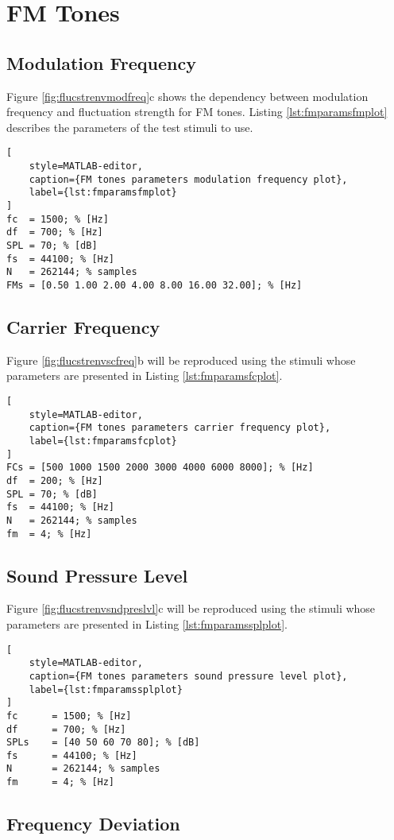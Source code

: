 \documentclass[a4paper]{article}
\begin{document}
\section{FM Tones}

\subsection{Modulation Frequency}

Figure \ref{fig:flucstrenvmodfreq}c shows the dependency between modulation
frequency and fluctuation strength for FM tones. Listing
\ref{lst:fmparamsfmplot} describes the parameters of the test stimuli to use.

\begin{lstlisting}[
    style=MATLAB-editor,
    caption={FM tones parameters modulation frequency plot},
    label={lst:fmparamsfmplot}
]
fc  = 1500; % [Hz]
df  = 700; % [Hz]
SPL = 70; % [dB]
fs  = 44100; % [Hz]
N   = 262144; % samples
FMs = [0.50 1.00 2.00 4.00 8.00 16.00 32.00]; % [Hz]
\end{lstlisting}

\subsection{Carrier Frequency}

Figure \ref{fig:flucstrenvscfreq}b will be reproduced using the stimuli whose
parameters are presented in Listing \ref{lst:fmparamsfcplot}.

\begin{lstlisting}[
    style=MATLAB-editor,
    caption={FM tones parameters carrier frequency plot},
    label={lst:fmparamsfcplot}
]
FCs = [500 1000 1500 2000 3000 4000 6000 8000]; % [Hz]
df  = 200; % [Hz]
SPL = 70; % [dB]
fs  = 44100; % [Hz]
N   = 262144; % samples
fm  = 4; % [Hz]
\end{lstlisting}

\subsection{Sound Pressure Level}

Figure \ref{fig:flucstrenvsndpreslvl}c will be reproduced using the stimuli
whose parameters are presented in Listing \ref{lst:fmparamssplplot}.

\begin{lstlisting}[
    style=MATLAB-editor,
    caption={FM tones parameters sound pressure level plot},
    label={lst:fmparamssplplot}
]
fc      = 1500; % [Hz]
df      = 700; % [Hz]
SPLs    = [40 50 60 70 80]; % [dB]
fs      = 44100; % [Hz]
N       = 262144; % samples
fm      = 4; % [Hz]
\end{lstlisting}

\subsection{Frequency Deviation}

\custombibliography
\end{document}
